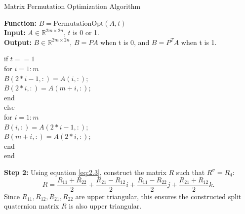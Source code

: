 \documentclass[1p]{elsarticle}
\numberwithin{equation}{section}
\begin{document}
\begin{algorithm}[htbp]
    \caption{Matrix Permutation Optimization Algorithm}
    \label{alg:Permutation Optimization}
    \textbf{Function:} $B=\text{PermutationOpt}(A,t)$\\
    \textbf{Input:} \indent  $ A\in \mathbb{R}^{2m\times 2n}$, $t$ is 0 or 1. \\
    {\textbf{Output:}}  $B \in\mathbb{R}^{2m\times 2n}$, $B=PA$ when t is 0, and $B=P^TA$ when t is 1.
          \begin{algorithmic}
          \raggedright 
          \item[] if $t == 1$\\
          \quad for $i = 1:m$\\
          \qquad $B(2*i-1, :) = A(i, :);$\\
          \qquad $B(2*i, :) = A(m+i, :);$\\
          \quad end\\
          \noindent else\\
          \quad for $i = 1:m$\\
          \qquad $B(i, :) = A(2*i-1, :);$\\
          \qquad $B(m+i, :) = A(2*i, :);$\\
          \quad end\\
          end
          \end{algorithmic}
\end{algorithm}

\textbf{Step 2:} Using equation \eqref{eq:2.3}, construct the matrix $R$ such that $R^\sigma=R_4:$
$$
R = \frac{R_{11} + R_{22}}{2} + \frac{R_{21} - R_{12}}{2}i + \frac{R_{11} - R_{22}}{2}j + \frac{R_{21} + R_{12}}{2}k.
$$
Since $R_{11}, R_{12}, R_{21}, R_{22}$ are upper triangular, this ensures the constructed split quaternion matrix $R$ is also upper triangular.
\end{document}
